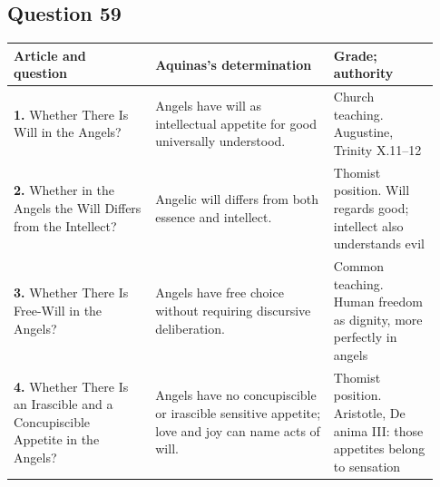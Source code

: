 \subsection{Question 59}
\begin{longtable}{@{}>{\raggedright\arraybackslash}p{0.31\linewidth}>{\raggedright\arraybackslash}p{0.39\linewidth}>{\raggedright\arraybackslash}p{0.23\linewidth}@{}}
\toprule
Article and question & Aquinas's determination & Grade; authority\\
\midrule\endhead
\textbf{1.} Whether There Is Will in the Angels? & Angels have will as intellectual appetite for good universally understood. & Church teaching. Augustine, Trinity X.11--12\\
\textbf{2.} Whether in the Angels the Will Differs from the Intellect? & Angelic will differs from both essence and intellect. & Thomist position. Will regards good; intellect also understands evil\\
\textbf{3.} Whether There Is Free-Will in the Angels? & Angels have free choice without requiring discursive deliberation. & Common teaching. Human freedom as dignity, more perfectly in angels\\
\textbf{4.} Whether There Is an Irascible and a Concupiscible Appetite in the Angels? & Angels have no concupiscible or irascible sensitive appetite; love and joy can name acts of will. & Thomist position. Aristotle, De anima III: those appetites belong to sensation\\
\bottomrule
\end{longtable}
